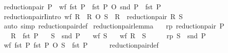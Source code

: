 \begin{isabellebody}
{}
\isamarkuptrue%
%
\endisatagdocument
{\isafolddocument}%
%
\isadelimdocument
%
\endisadelimdocument
{}\isamarkupfalse%
\ {\isachardoublequoteopen}reduction{\isacharunderscore}{\kern0pt}pair\ P\ {\isasymlongleftrightarrow}\ wf\ {\isacharparenleft}{\kern0pt}fst\ P{\isacharparenright}{\kern0pt}\ {\isasymand}\ fst\ P\ O\ snd\ P\ {\isasymsubseteq}\ fst\ P{\isachardoublequoteclose}\isanewline
\isanewline
{}\isamarkupfalse%
\ reduction{\isacharunderscore}{\kern0pt}pairI{\isacharbrackleft}{\kern0pt}intro{\isacharbrackright}{\kern0pt}{\isacharcolon}{\kern0pt}\ {\isachardoublequoteopen}wf\ R\ {\isasymLongrightarrow}\ R\ O\ S\ {\isasymsubseteq}\ R\ {\isasymLongrightarrow}\ reduction{\isacharunderscore}{\kern0pt}pair\ {\isacharparenleft}{\kern0pt}R{\isacharcomma}{\kern0pt}\ S{\isacharparenright}{\kern0pt}{\isachardoublequoteclose}\isanewline
%
\isadelimproof
\ \ %
\endisadelimproof
%
\isatagproof
{}\isamarkupfalse%
\ {\isacharparenleft}{\kern0pt}auto\ simp{\isacharcolon}{\kern0pt}\ reduction{\isacharunderscore}{\kern0pt}pair{\isacharunderscore}{\kern0pt}def{\isacharparenright}{\kern0pt}%
\endisatagproof
{\isafoldproof}%
%
\isadelimproof
\isanewline
%
\endisadelimproof
\isanewline
{}\isamarkupfalse%
\ reduction{\isacharunderscore}{\kern0pt}pair{\isacharunderscore}{\kern0pt}lemma{\isacharcolon}{\kern0pt}\isanewline
\ \ \ rp{\isacharcolon}{\kern0pt}\ {\isachardoublequoteopen}reduction{\isacharunderscore}{\kern0pt}pair\ P{\isachardoublequoteclose}\isanewline
\ \ \ {\isachardoublequoteopen}R\ {\isasymsubseteq}\ fst\ P{\isachardoublequoteclose}\isanewline
\ \ \ {\isachardoublequoteopen}S\ {\isasymsubseteq}\ snd\ P{\isachardoublequoteclose}\isanewline
\ \ \ {\isachardoublequoteopen}wf\ S{\isachardoublequoteclose}\isanewline
\ \ \ {\isachardoublequoteopen}wf\ {\isacharparenleft}{\kern0pt}R\ {\isasymunion}\ S{\isacharparenright}{\kern0pt}{\isachardoublequoteclose}\isanewline
%
\isadelimproof
%
\endisadelimproof
%
\isatagproof
{}\isamarkupfalse%
\ {\isacharminus}{\kern0pt}\isanewline
\ \ \isamarkupfalse%
\ rp\ {\isacartoucheopen}S\ {\isasymsubseteq}\ snd\ P{\isacartoucheclose}\ \isamarkupfalse%
\ {\isachardoublequoteopen}wf\ {\isacharparenleft}{\kern0pt}fst\ P{\isacharparenright}{\kern0pt}{\isachardoublequoteclose}\ {\isachardoublequoteopen}fst\ P\ O\ S\ {\isasymsubseteq}\ fst\ P{\isachardoublequoteclose}\isanewline
\ \ \ \ \isamarkupfalse%
\ reduction{\isacharunderscore}{\kern0pt}pair{\isacharunderscore}{\kern0pt}def\ \isamarkupfalse%

\end{isabellebody}
